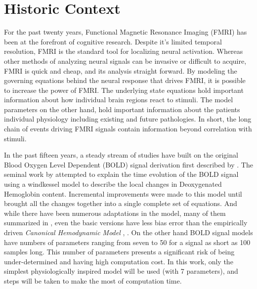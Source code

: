 \section{Historic Context}
For the past twenty years, Functional Magnetic Resonance Imaging (FMRI) 
has been at the forefront of cognitive research. Despite it's
limited temporal resolution, FMRI is the standard tool for localizing 
neural activation.  Whereas other methods
of analyzing neural signals can be invasive or difficult to acquire, 
FMRI is quick and cheap, and its analysis straight forward.
By modeling the governing equations behind the neural response that
drives FMRI, it is possible to increase the power of FMRI.
The underlying state equations hold important information
about how individual brain regions react to stimuli. The model parameters
on the other hand, hold important information about the patients individual
physiology including existing and future pathologies. In short,
the long chain of events driving FMRI signals contain information 
beyond correlation with stimuli.

In the past fifteen years, a steady stream of studies have built
on the original Blood Oxygen Level Dependent (BOLD) signal 
derivation first described by \cite{Ogawa}.
The seminal work by \cite{Buxton1998} attempted to explain the
time evolution of the BOLD signal using a windkessel model to
describe the local changes in Deoxygenated Hemoglobin content.
Incremental improvements were made to this model until
\cite{Friston2000} brought all the changes together into a single complete 
set of equations. And while there have been numerous adaptations in the model, 
many of them summarized in \cite{Deneux2006}, even the basic versions
have less bias error than the empirically driven \emph{Canonical Hemodynamic Model}
\cite{Deneux2006}, \cite{Handwerker2004}.
On the other hand BOLD signal models have numbers
of parameters ranging from seven \cite{Riera2004} to 50 \cite{Behzadi2005} 
for a signal as short as 100 samples long. This number of parameters presents
a significant risk of being under-determined and having high computation cost. 
In this work, only the simplest physiologically inspired model will be
used (with 7 parameters), and steps will be taken to make the most of computation
time.

